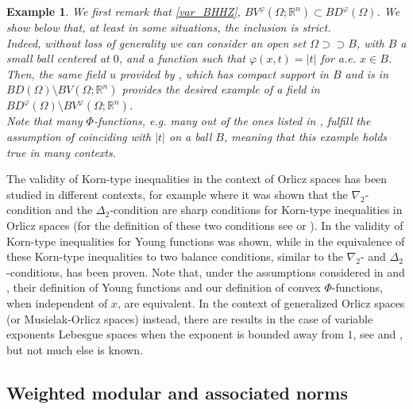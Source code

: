\documentclass[a4paper,11pt,oneside,notitlepage]{article}
\newtheorem{example}[theorem]{Example}
\numberwithin{equation}{section}
\def\R{\mathbb{R}}
\newcommand{\vphi}{\varphi}
\begin{document}
\begin{example}
    We first remark that \eqref{var_BHHZ}, $BV^\vphi(\Omega;\R^n) \subset BD^\vphi(\Omega)$. We show below that, at least in some situations, the inclusion is strict.
    \\
    Indeed, without loss of generality we can consider an open set $\Omega \supset \supset B$, with $B$ a small ball centered at $0$, and a function such that $\vphi(x,t) = |t|$ for a.e. $x \in B$. Then, the same field $u$ provided by \cite[Example 7.7]{ACD}, which has compact support in $B$ and is in $BD(\Omega) \setminus BV(\Omega; \R^n)$ provides the desired example of a field in $BD^\vphi(\Omega) \setminus BV^\vphi(\Omega; \R^n)$.
    \\
    Note that many $\Phi$-functions, e.g. many out of the ones listed in \cite[Example 2.5.3]{HaH}, fulfill the assumption of coinciding with $|t|$ on a ball $B$, meaning that this example holds true in many contexts.
\end{example}

The validity of Korn-type inequalities in the context of Orlicz spaces has been studied in different contexts, for example \cite[Theorem 1.1]{BD12} where it was shown that the $\nabla_2$-condition and the $\Delta_2$-condition are sharp conditions for Korn-type inequalities in Orlicz spaces (for the definition of these two conditions see \cite[Subsection 2.3]{rao-ren} or \cite[Equations (2.6) \& (2.7)]{BCD17}). In \cite[Theorems 3.1 \& 3.3]{C14} the validity of Korn-type inequalities for Young functions was shown, while in \cite[Theorems 3.1 \& 3.3]{BCD17} the equivalence of these Korn-type inequalities to two balance conditions, similar to the $\nabla_2$- and $\Delta_2$-conditions, has been proven. Note that, under the assumptions considered in \cite{C14} and \cite{BCD17}, their definition of Young functions and our definition of convex $\Phi$-functions, when independent of $x$, are equivalent. In the context of generalized Orlicz spaces (or Musielak-Orlicz spaces) instead, there are results in the case of variable exponents Lebesgue spaces when the exponent is bounded away from $1$, see \cite[Section 5]{DR03} and \cite[Theorems 14.3.21 \& 14.3.23]{HHbook}, but not much else is known.


\subsection{Weighted modular and associated norms}
\label{sec:prop_var_mod}
\end{document}
